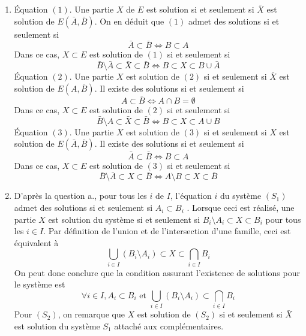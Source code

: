 \begin{enumerate}
 \item \'Equation $(1)$. Une partie $X$ de $E$ est solution si et seulement si $\bar{X}$ est solution de $E(\bar{A},\bar{B})$. On en déduit que $(1)$ admet des solutions si et seulement si 
\begin{displaymath}
 \bar{A}\subset \bar{B}\Leftrightarrow B \subset A
\end{displaymath}
Dans ce cas, $X\subset E$ est solution de $(1)$ si et seulement si
\begin{displaymath}
 \bar{B}\setminus \bar{A}\subset \bar{X}\subset \bar{B}
\Leftrightarrow
B\subset X\subset B \cup \bar{A} 
\end{displaymath}
\'Equation $(2)$. Une partie $X$ est solution de $(2)$ si et seulement si $\bar{X}$ est solution de $E(A,\bar{B})$. Il existe des solutions si et seulement si 
\begin{displaymath}
 A\subset \bar{B} \Leftrightarrow A\cap B =\emptyset
\end{displaymath}
Dans ce cas, $X\subset E$ est solution de $(2)$ si et seulement si
\begin{displaymath}
 \bar{B}\setminus A \subset \bar{X}\subset \bar{B}
\Leftrightarrow
B\subset X\subset A \cup B 
\end{displaymath}
\'Equation $(3)$. Une partie $X$ est solution de $(3)$ si et seulement si $X$ est solution de $E(\bar{A},\bar{B})$. Il existe des solutions si et seulement si 
\begin{displaymath}
 \bar{A}\subset \bar{B} \Leftrightarrow B\subset A
\end{displaymath}
Dans ce cas, $X\subset E$ est solution de $(3)$ si et seulement si
\begin{displaymath}
 \bar{B}\setminus \bar{A} \subset X\subset \bar{B}
\Leftrightarrow
A\setminus B \subset X \subset \bar{B}
\end{displaymath}
\item D'après la question a., pour tous les $i$ de $I$, l'équation $i$ du système $(S_1)$ admet des solutions si et seulement si $A_i\subset B_i$ . Lorsque ceci est réalisé, une partie $X$ est solution du système si et seulement si $B_i\setminus A_i \subset X \subset B_i$ pour tous les $i\in I$. Par définition de l'union et de l'intersection d'une famille, ceci est équivalent à
\begin{displaymath}
 \bigcup_{i\in I}(B_i\setminus A_i) \subset X \subset \bigcap_{i\in I} B_i 
\end{displaymath}
On peut donc conclure que la condition assurant l'existence de solutions pour le système est
\begin{displaymath}
 \forall i\in I, A_i\subset B_i \text{ et } \bigcup_{i\in I}(B_i\setminus A_i) \subset \bigcap_{i\in I} B_i
\end{displaymath}
Pour $(S_2)$, on remarque que $X$ est solution de $(S_2)$ si et seulement si $\bar{X}$ est solution du système $S_1$ attaché aux complémentaires.
\end{enumerate}
 
